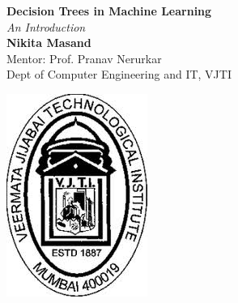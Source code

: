 \documentclass[a0,portrait]{a0poster}
\begin{document}


\begin{minipage}[b]{0.75\linewidth}
\VeryHuge \color{NavyBlue} \textbf{Decision Trees in Machine Learning} \color{Black}\\ %
\Huge\textit{An Introduction}\\[2.4cm] %
\huge \textbf{Nikita Masand}\\[0.5cm] 
Mentor: Prof. Pranav Nerurkar\\[0.5cm] %
\huge Dept of Computer Engineering and IT, VJTI \\[0.4cm] %
\end{minipage}
%
\begin{minipage}[b]{0.25\linewidth}
\includegraphics[width=8 cm]{logo.jpeg}\ 
\end{minipage}

\vspace{1cm} %
\end{document}
